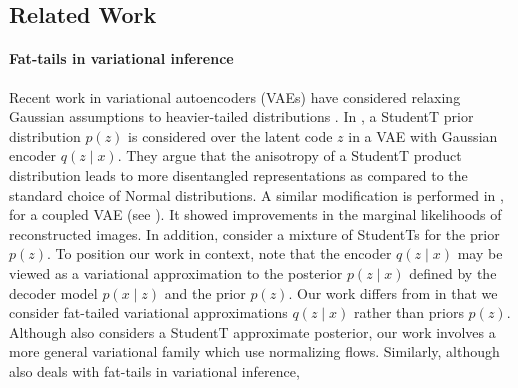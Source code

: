 \documentclass[twoside]{article}
\theoremstyle{definition}
\theoremstyle{remark}
\begin{document}
\subsection*{Related Work}
\vspace{-1mm}
\paragraph{Fat-tails in variational inference}

Recent work in variational autoencoders (VAEs) have considered relaxing Gaussian assumptions to heavier-tailed distributions \citep{mathieu2019disentangling,chen2019residual,boenninghoff2020variational,abiri2020variational}.
In \citep{mathieu2019disentangling}, a StudentT prior distribution $p(z)$ is considered over the latent code
$z$ in a VAE with Gaussian encoder $q(z \mid x)$. They argue
that the anisotropy of a StudentT product distribution leads to more disentangled representations as compared to the standard choice of Normal distributions.
A similar modification is performed in \citet{chen2020use}, for
a coupled VAE (see \citet{cao2019coupled}). It showed improvements in the marginal
likelihoods of reconstructed images. In addition,
\citet{boenninghoff2020variational} consider a mixture of StudentTs for the
prior $p(z)$. To position
our work in context, note that the encoder $q(z \mid x)$ may be viewed
as a variational approximation to the posterior $p(z \mid x)$ defined by the
decoder model $p(x \mid z)$ and the prior $p(z)$. Our work differs from
\citet{mathieu2019disentangling,chen2020use,boenninghoff2020variational} in
that we consider fat-tailed variational approximations $q(z \mid x)$ rather
than priors $p(z)$. Although \citet{abiri2020variational} also considers
a StudentT approximate posterior, our work involves a more general
variational family which use normalizing flows.
Similarly, although \citet{wang2018variational} also deals with fat-tails in variational inference,
\end{document}
